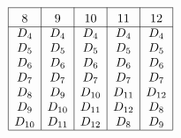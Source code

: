 \documentclass[conference,letterpaper]{IEEEtran}
\begin{document}
\begin{example}
\begin{align*}
\begin{array}{rl|c|c|c|c|c|}\cline{3-3}\cline{4-4}\cline{5-5}\cline{6-6}\cline{7-7}
&&\rule{0pt}{1.2em}\mbox{\textnormal{8}} & \rule{0pt}{1.2em}\mbox{\textnormal{9}}  & \rule{0pt}{1.2em}\mbox{\textnormal{10}} & \rule{0pt}{1.2em}\mbox{\textnormal{11}} & \rule{0pt}{1.2em}\mbox{\textnormal{12}} \\ \cline{3-3}\cline{4-4}\cline{5-5}\cline{6-6}\cline{7-7}
&&  D_4& D_4 & D_4 & D_4 & D_4\\
&&  D_5& D_5 & D_5 & D_5 & D_5\\
&&  D_6& D_6 & D_6 & D_6 & D_6\\
&&  D_7& D_7 & D_7 & D_7 & D_7\\
&&  D_8& D_9 & D_{10} & D_{11} & D_{12}\\
&&  D_9& D_{10} & D_{11} & D_{12} & D_8\\
&&  D_{10}& D_{11} & D_{12} & D_8 & D_9 \\
\cline{3-3}\cline{4-4}\cline{5-5}\cline{6-6}\cline{7-7}
\end{array}
\end{align*}



\end{example}
\end{document}
